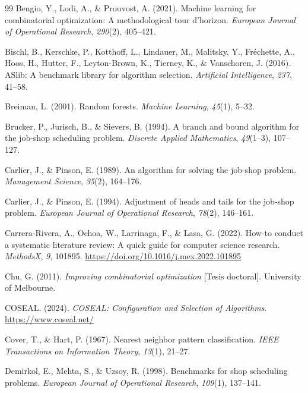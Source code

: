 \begin{thebibliography}{99}
Bengio, Y., Lodi, A., \& Prouvost, A. (2021). Machine learning for
combinatorial optimization: A methodological tour d'horizon. \textit{European
Journal of Operational Research}, \textit{290}(2), 405--421.

Bischl, B., Kerschke, P., Kotthoff, L., Lindauer, M., Malitsky, Y., Fréchette,
A., Hoos, H., Hutter, F., Leyton-Brown, K., Tierney, K., \& Vanschoren, J.
(2016). ASlib: A benchmark library for algorithm selection.
\textit{Artificial Intelligence}, \textit{237}, 41--58.

Breiman, L. (2001). Random forests. \textit{Machine Learning}, \textit{45}(1),
5--32.

Brucker, P., Jurisch, B., \& Sievers, B. (1994). A branch and bound algorithm
for the job-shop scheduling problem. \textit{Discrete Applied Mathematics},
\textit{49}(1--3), 107--127.

Carlier, J., \& Pinson, E. (1989). An algorithm for solving the job-shop
problem. \textit{Management Science}, \textit{35}(2), 164--176.

Carlier, J., \& Pinson, E. (1994). Adjustment of heads and tails for the
job-shop problem. \textit{European Journal of Operational Research},
\textit{78}(2), 146--161.

Carrera-Rivera, A., Ochoa, W., Larrinaga, F., \& Lasa, G. (2022). How-to
conduct a systematic literature review: A quick guide for computer science
research. \textit{MethodsX}, \textit{9}, 101895.
\url{https://doi.org/10.1016/j.mex.2022.101895}

Chu, G. (2011). \textit{Improving combinatorial optimization} [Tesis
doctoral]. University of Melbourne.

COSEAL. (2024). \textit{COSEAL: Configuration and Selection of Algorithms}.
\url{https://www.coseal.net/}

Cover, T., \& Hart, P. (1967). Nearest neighbor pattern classification.
\textit{IEEE Transactions on Information Theory}, \textit{13}(1), 21--27.

Demirkol, E., Mehta, S., \& Uzsoy, R. (1998). Benchmarks for shop scheduling
problems. \textit{European Journal of Operational Research}, \textit{109}(1),
137--141.


\end{thebibliography}
